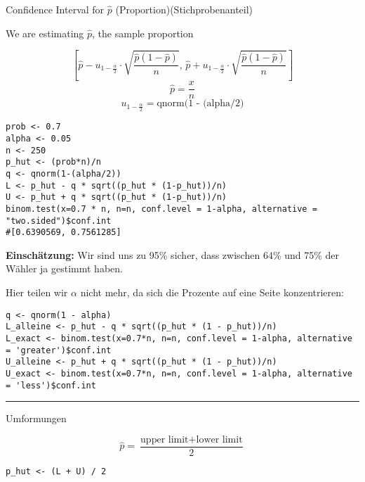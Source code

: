 \begin{multicols*}{2}

\begin{center}
     \Large{Confidence Interval for $\hat{p}$ (Proportion)(Stichprobenanteil)}
\end{center}

\begin{center}
     \Large{We are estimating $\hat{p}$, the sample proportion}
\end{center}

\[
\left[ \hat{p} - u_{1 - \frac{\alpha}{2}} \cdot \sqrt{\frac{\hat{p}(1 - \hat{p})}{n}}, \, \hat{p} + u_{1 - \frac{\alpha}{2}} \cdot \sqrt{\frac{\hat{p}(1 - \hat{p})}{n}} \right]
\]
$$\hat{p} = \frac{x}{n}$$
$$
u_{1 - \frac{\alpha}{2}} = \text{qnorm(1 - (alpha/2)}
$$
\begin{lstlisting}
prob <- 0.7
alpha <- 0.05
n <- 250
p_hut <- (prob*n)/n
q <- qnorm(1-(alpha/2))
L <- p_hut - q * sqrt((p_hut * (1-p_hut))/n)
U <- p_hut + q * sqrt((p_hut * (1-p_hut))/n)
binom.test(x=0.7 * n, n=n, conf.level = 1-alpha, alternative = "two.sided")$conf.int
#[0.6390569, 0.7561285]
\end{lstlisting}
\textbf{Einschätzung:}
Wir sind uns zu 95\% sicher, dass zwischen 64\% und 75\% der Wähler ja gestimmt haben.
\bigbreak


Hier teilen wir $\alpha$ nicht mehr, da sich die Prozente auf eine Seite konzentrieren:

\begin{lstlisting}
q <- qnorm(1 - alpha)
L_alleine <- p_hut - q * sqrt((p_hut * (1 - p_hut))/n)
L_exact <- binom.test(x=0.7*n, n=n, conf.level = 1-alpha, alternative = 'greater')$conf.int
U_alleine <- p_hut + q * sqrt((p_hut * (1 - p_hut))/n)
U_exact <- binom.test(x=0.7*n, n=n, conf.level = 1-alpha, alternative = 'less')$conf.int

\end{lstlisting}

\hrule

\begin{center}
     \Large{Umformungen}
\end{center}

\[
\hat{p} = \frac{\text{upper limit} + \text{lower limit}}{2}
\]

\begin{lstlisting}
p_hut <- (L + U) / 2
\end{lstlisting}


\end{multicols*}
